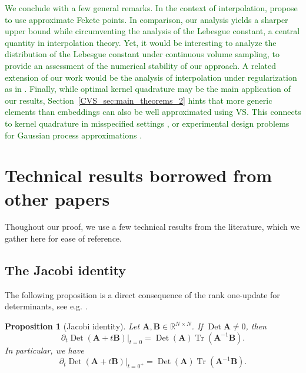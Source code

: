 \documentclass[twoside,11pt]{book}
\newcommand{\rev}[1]{\textcolor{darkgreen}{#1}}
\newtheorem{proposition}{Proposition}
\numberwithin{theorem}{chapter}
\numberwithin{definition}{chapter}
\numberwithin{proposition}{chapter}
\numberwithin{corollary}{chapter}
\numberwithin{example}{chapter}
\numberwithin{lemma}{chapter}
\numberwithin{assumption}{chapter}
\DeclareMathOperator{\Tr}{Tr}
\DeclareMathOperator{\Det}{Det}
\begin{document}
\rev{We conclude with a few general remarks.}
\rev{
In the context of interpolation, \citep{KaSaTa19} propose to use approximate Fekete points. In comparison, our analysis yields a sharper upper bound while circumventing the analysis of the Lebesgue constant, a central quantity in interpolation theory. Yet, it would be interesting to analyze the distribution of the Lebesgue constant under continuous volume sampling, to provide an assessment of the numerical stability of our approach. A related extension of our work would be the analysis of interpolation under regularization as in \citep{Bac17}.
Finally, while optimal kernel quadrature may be the main application of our results, Section~\ref{CVS_sec:main_theorems_2} hints that more generic elements than embeddings can also be well approximated using VS. This connects to kernel quadrature in misspecified settings \citep{KaSrFu16}, or experimental design problems for Gaussian process approximations \citep{WyBrGi20}.
}

\section{Technical results borrowed from other papers}
Thoughout our proof, we use a few technical results from the literature, which we gather here for ease of reference.
\subsection{The Jacobi identity}
The following proposition is a direct consequence of the rank one-update for determinants, see e.g. \citep[Theorem 3.11]{MaSpSr15}.
\begin{proposition}[Jacobi identity]\label{CVS_thm:jacobi_identity}
Let $\bm{A}, \bm{B} \in \mathbb{R}^{N \times N}$. If $\Det\bm{A}\neq 0$, then
\begin{equation}
\partial_{t} \Det (\bm{A}+t\bm{B})|_{t = 0} = \Det(\bm{A}) \Tr(\bm{A}^{-1}\bm{B}).
\end{equation}
In particular, we have
\begin{equation}
\partial_{t} \Det (\bm{A}+t\bm{B})|_{t = 0^{+}} = \Det(\bm{A}) \Tr(\bm{A}^{-1}\bm{B}).
\end{equation}
\end{proposition}
\end{document}
